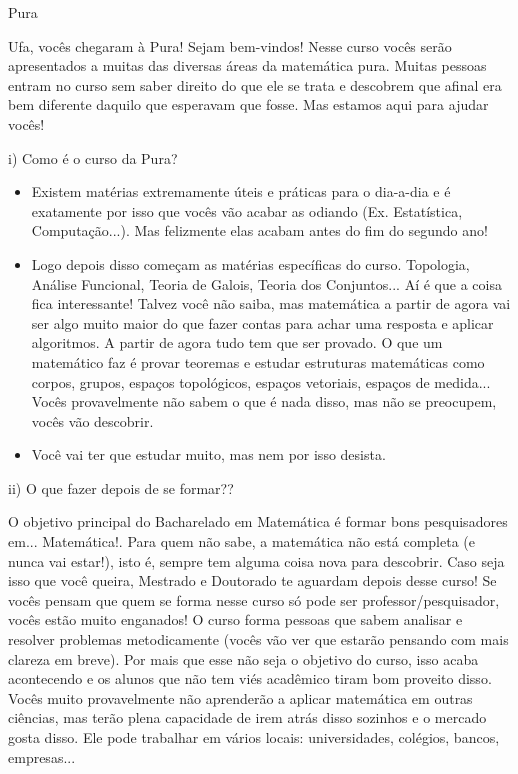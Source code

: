 \begin{subsecao}{Pura}


Ufa, vocês chegaram à Pura! Sejam bem-vindos! Nesse curso vocês serão apresentados a
muitas das diversas áreas da matemática pura. Muitas pessoas entram no curso
sem saber direito do que ele se trata e descobrem que afinal era bem diferente
daquilo que esperavam que fosse. Mas estamos aqui para ajudar vocês!

i) Como é o curso da Pura?

\begin{itemize}

\item  Existem matérias extremamente úteis e práticas para o dia-a-dia e é
exatamente por isso que vocês vão acabar as odiando (Ex. Estatística,
Computação...). Mas felizmente elas acabam antes do fim do segundo ano!
\item  Logo depois disso começam as matérias específicas do curso. Topologia,
Análise Funcional, Teoria de Galois, Teoria dos Conjuntos... Aí é que a coisa
fica interessante! Talvez você não saiba, mas matemática a partir de agora vai
ser algo muito maior do que fazer contas para achar uma resposta e aplicar
algoritmos. A partir de agora tudo tem que ser provado. O que um matemático
faz é provar teoremas e estudar estruturas matemáticas como corpos, grupos,
espaços topológicos, espaços vetoriais, espaços de medida... Vocês provavelmente
não sabem o que é nada disso, mas não se preocupem, vocês vão descobrir.
\item  Você vai ter que estudar muito, mas nem por isso desista.

\end{itemize}

ii) O que fazer depois de se formar??

O objetivo principal do Bacharelado em Matemática é formar bons pesquisadores
em... Matemática!. Para quem não
sabe, a matemática não está completa (e nunca vai estar!), isto é, sempre tem
alguma coisa nova para descobrir. Caso seja isso que você queira, Mestrado e
Doutorado te aguardam depois desse curso! Se vocês pensam que quem se forma nesse
curso só pode ser professor/pesquisador, vocês estão muito enganados! O curso forma
pessoas que sabem analisar e resolver problemas metodicamente (vocês vão ver que
estarão pensando com mais clareza em breve). Por mais que esse não seja o objetivo
do curso, isso acaba acontecendo e os alunos que não tem viés acadêmico tiram bom
proveito disso. Vocês muito provavelmente não aprenderão a aplicar matemática em
outras ciências, mas terão plena capacidade de irem atrás disso sozinhos e o mercado
gosta disso. Ele pode trabalhar em vários locais: universidades, colégios, bancos,
empresas...


\end{subsecao}
